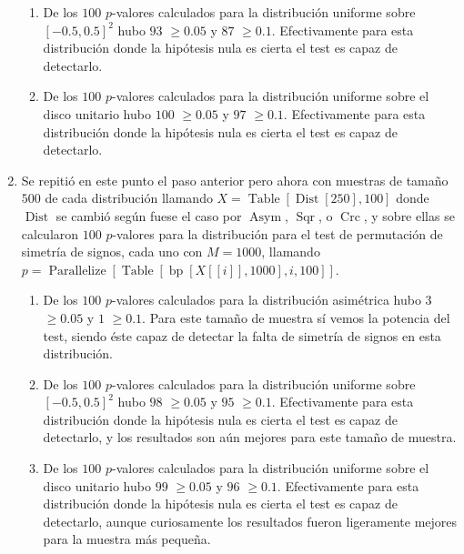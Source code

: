 \documentclass[letter]{article}
\begin{document}
\begin{enumerate}
\begin{enumerate}[label=(\roman*)]
\item De los $100$ $p$-valores calculados para la distribución uniforme sobre $[-0.5,0.5]^2$ hubo $93$ $\geq 0.05$ y $87$ $\geq 0.1$. Efectivamente para esta distribución donde la hipótesis nula es cierta el test es capaz de detectarlo.

\item De los $100$ $p$-valores calculados para la distribución uniforme sobre el disco unitario hubo $100$ $\geq 0.05$ y $97$ $\geq 0.1$. Efectivamente para esta distribución donde la hipótesis nula es cierta el test es capaz de detectarlo.

\end{enumerate}

\item Se repitió en este punto el paso anterior pero ahora con muestras de tamaño $500$ de cada distribución llamando $X = \operatorname{Table}[\operatorname{Dist}[250],100]$ donde $\operatorname{Dist}$ se cambió según fuese el caso por $\operatorname{Asym}$, $\operatorname{Sqr}$, o $\operatorname{Crc}$, y sobre ellas se calcularon $100$ $p$-valores para la distribución para el test de permutación de simetría de signos, cada uno con $M = 1000$, llamando $p = \operatorname{Parallelize}[\operatorname{Table}[\operatorname{bp}[X[[i]],1000],{i,100}]]$.

\begin{enumerate}[label=(\roman*)]

\item De los $100$ $p$-valores calculados para la distribución asimétrica hubo $3$ $\geq 0.05$ y $1$ $\geq 0.1$. Para este tamaño de muestra sí vemos la potencia del test, siendo éste capaz de detectar la falta de simetría de signos en esta distribución.

\item De los $100$ $p$-valores calculados para la distribución uniforme sobre $[-0.5,0.5]^2$ hubo $98$ $\geq 0.05$ y $95$ $\geq 0.1$. Efectivamente para esta distribución donde la hipótesis nula es cierta el test es capaz de detectarlo, y los resultados son aún mejores para este tamaño de muestra.

\item De los $100$ $p$-valores calculados para la distribución uniforme sobre el disco unitario hubo $99$ $\geq 0.05$ y $96$ $\geq 0.1$. Efectivamente para esta distribución donde la hipótesis nula es cierta el test es capaz de detectarlo, aunque curiosamente los resultados fueron ligeramente mejores para la muestra más pequeña.


\end{enumerate}
\end{enumerate}
\end{document}
